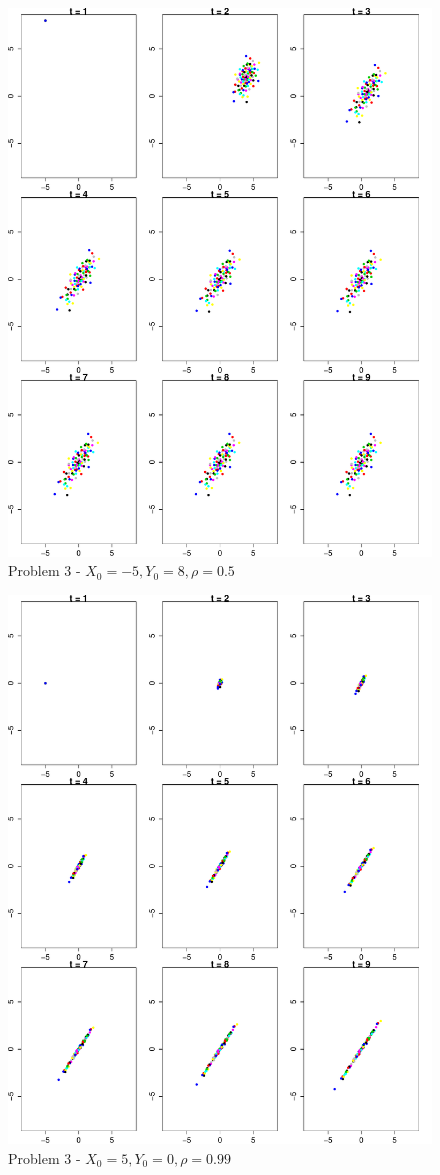 \documentclass[paper=a4, fontsize=11pt]{scrartcl} %
\numberwithin{equation}{section} %
\numberwithin{figure}{section} %
\numberwithin{table}{section} %
\begin{document}
\begin{figure}[h!]
	\centering
	\includegraphics[scale = 0.8]{3b.pdf}
	\caption{Problem 3 - $X_0 = -5, Y_0 = 8, \rho = 0.5$} 
\end{figure}
\newpage
\begin{figure}[h!]
	\centering
	\includegraphics[scale = 0.8]{3c.pdf}
	\caption{Problem 3 - $X_0 = 5, Y_0 = 0, \rho = 0.99$}
	
\end{figure}
\end{document}
